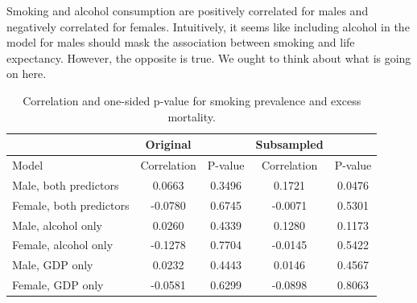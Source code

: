 \documentclass{article}
\begin{document}
Smoking and alcohol consumption are positively correlated for males and negatively correlated for females.  Intuitively, it seems like including alcohol in the model for males should mask the association between smoking and life expectancy.  However, the opposite is true.  We ought to think about what is going on here.

\begin{table}[h]
\begin{center}
\begin{tabular}{l cc|cc }
& Original && Subsampled & \\
\hline\hline
 Model & Correlation & P-value & Correlation & P-value  \\ \hline
 Male, both predictors & 0.0663 & 0.3496 & 0.1721 & 0.0476\\ 
 Female, both predictors & -0.0780 & 0.6745 & -0.0071 & 0.5301\\ \hline
 Male, alcohol only & 0.0260 & 0.4339 & 0.1280 & 0.1173\\ 
 Female, alcohol only & -0.1278 & 0.7704 & -0.0145 & 0.5422\\ \hline
 Male, GDP only & 0.0232 & 0.4443 & 0.0146 & 0.4567\\ 
 Female, GDP only & -0.0581 & 0.6299 & -0.0898 & 0.8063\\ 
\hline
 \end{tabular}
\end{center}
\caption{Correlation and one-sided p-value for smoking prevalence and excess mortality.}
\label{tab:smoking_sensitivity}
\end{table}%
\end{document}
